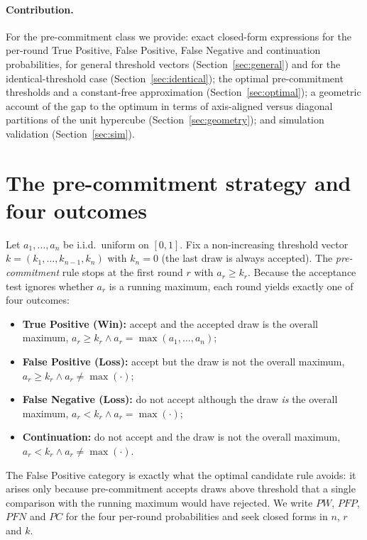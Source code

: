 \documentclass[11pt]{article}
\newcommand{\amax}{\operatorname{max}}
\begin{document}
\paragraph{Contribution.} For the pre-commitment class we provide:
exact closed-form expressions for the per-round True Positive, False Positive, False
Negative and continuation probabilities, for general threshold vectors
(Section~\ref{sec:general}) and for the identical-threshold case
(Section~\ref{sec:identical}); the optimal pre-commitment thresholds and a
constant-free approximation (Section~\ref{sec:optimal}); a geometric account of the
gap to the optimum in terms of axis-aligned versus diagonal partitions of the unit
hypercube (Section~\ref{sec:geometry}); and simulation validation
(Section~\ref{sec:sim}).

\section{The pre-commitment strategy and four outcomes}\label{sec:setup}

Let $a_1,\dots,a_n$ be i.i.d.\ uniform on $[0,1]$. Fix a non-increasing threshold
vector $k=(k_1,\dots,k_{n-1},k_n)$ with $k_n=0$ (the last draw is always accepted). The
\emph{pre-commitment} rule stops at the first round $r$ with $a_r\ge k_r$. Because the
acceptance test ignores whether $a_r$ is a running maximum, each round yields exactly
one of four outcomes:
\begin{itemize}[nosep]
  \item \textbf{True Positive (Win):} accept and the accepted draw is the overall
        maximum, $a_r\ge k_r \wedge a_r=\amax(a_1,\dots,a_n)$;
  \item \textbf{False Positive (Loss):} accept but the draw is not the overall maximum,
        $a_r\ge k_r \wedge a_r\neq \amax(\cdot)$;
  \item \textbf{False Negative (Loss):} do not accept although the draw \emph{is} the
        overall maximum, $a_r< k_r \wedge a_r=\amax(\cdot)$;
  \item \textbf{Continuation:} do not accept and the draw is not the overall maximum,
        $a_r< k_r \wedge a_r\neq \amax(\cdot)$.
\end{itemize}
The False Positive category is exactly what the optimal candidate rule avoids: it
arises only because pre-commitment accepts draws above threshold that a single
comparison with the running maximum would have rejected. We write $PW$, $PFP$, $PFN$
and $PC$ for the four per-round probabilities and seek closed forms in $n$, $r$ and
$k$.
\end{document}

